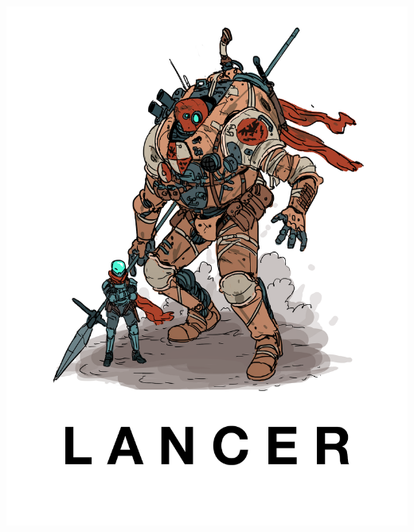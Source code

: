 \documentclass[11pt, letterpaper, openany]{memoir}
\begin{document}
\frontmatter
\pagestyle{empty}
\begingroup
{}


\begin{center}
  \includegraphics{Cover}
\end{center}
\end{document}
